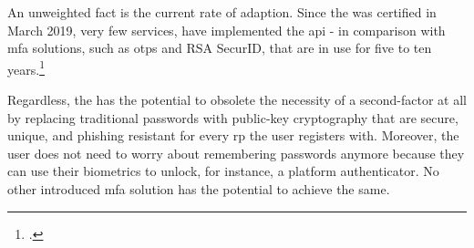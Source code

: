 An unweighted fact is the current rate of adaption. Since the \wa{} was certified in March 2019, very few services, have implemented the \gls{api} - in comparison with \gls{mfa} solutions, such as \glspl{otp} and RSA SecurID, that are in use for five to ten years.\footcites[See][]{works-with-yubico}
 
Regardless, the \wa{} has the potential to obsolete the necessity of a second-factor at all by replacing traditional passwords with public-key cryptography that are secure, unique, and phishing resistant for every \gls{rp} the user registers with. Moreover, the user does not need to worry about remembering passwords anymore because they can use their biometrics to unlock, for instance, a platform authenticator. No other introduced \gls{mfa} solution has the potential to achieve the same.
